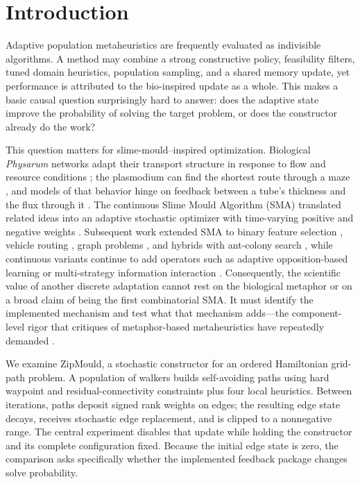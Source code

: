 \documentclass[pdflatex,sn-basic,iicol]{sn-jnl}
\begin{document}
\section{Introduction}

Adaptive population metaheuristics are frequently evaluated as indivisible algorithms. A method may combine a strong constructive policy, feasibility filters, tuned domain heuristics, population sampling, and a shared memory update, yet performance is attributed to the bio-inspired update as a whole. This makes a basic causal question surprisingly hard to answer: does the adaptive state improve the probability of solving the target problem, or does the constructor already do the work?

This question matters for slime-mould--inspired optimization. Biological \emph{Physarum} networks adapt their transport structure in response to flow and resource conditions \citep{tero2010network}; the plasmodium can find the shortest route through a maze \citep{nakagaki2000maze}, and models of that behavior hinge on feedback between a tube's thickness and the flux through it \citep{tero2007model}. The continuous Slime Mould Algorithm (SMA) translated related ideas into an adaptive stochastic optimizer with time-varying positive and negative weights \citep{li2020sma}. Subsequent work extended SMA to binary feature selection \citep{abdelbasset2021binary}, vehicle routing \citep{zhang2023cvrp}, graph problems \citep{zhang2016graph}, and hybrids with ant-colony search \citep{rong2021smfaco}, while continuous variants continue to add operators such as adaptive opposition-based learning \citep{naik2021aosma} or multi-strategy information interaction \citep{liu2023msiisma}. Consequently, the scientific value of another discrete adaptation cannot rest on the biological metaphor or on a broad claim of being the first combinatorial SMA. It must identify the implemented mechanism and test what that mechanism adds---the component-level rigor that critiques of metaphor-based metaheuristics have repeatedly demanded \citep{sorensen2015metaphor,aranha2022metaphor,camachovillalon2023exposing}.

We examine ZipMould, a stochastic constructor for an ordered Hamiltonian grid-path problem. A population of walkers builds self-avoiding paths using hard waypoint and residual-connectivity constraints plus four local heuristics. Between iterations, paths deposit signed rank weights on edges; the resulting edge state decays, receives stochastic edge replacement, and is clipped to a nonnegative range. The central experiment disables that update while holding the constructor and its complete configuration fixed. Because the initial edge state is zero, the comparison asks specifically whether the implemented feedback package changes solve probability.
\end{document}
